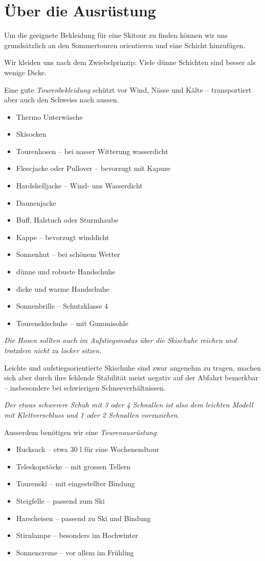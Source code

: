 \section{Über die Ausrüstung}

Um die geeignete Bekleidung für eine Skitour zu finden können wir uns grundsätzlich an den Sommertouren orientieren und eine Schicht hinzufügen.

Wir kleiden uns nach dem Zwiebelprinzip: Viele dünne Schichten sind besser als wenige Dicke.

Eine gute \textit{Tourenbekleidung} schützt vor Wind, Nässe und Kälte -- transportiert aber auch den Schweiss nach aussen.

\begin{itemize}
  \item{Thermo Unterwäsche}
  \item{Skisocken}
  \item{Tourenhosen -- bei nasser Witterung wasserdicht}
  \item{Fleecjacke oder Pullover -- bevorzugt mit Kapuze}
  \item{Hardshelljacke -- Wind- uns Wasserdicht}
  \item{Daunenjacke}
  \item{Buff, Halstuch oder Sturmhaube}
  \item{Kappe -- bevorzugt winddicht}
  \item{Sonnenhut -- bei schönem Wetter}
  \item{dünne und robuste Handschuhe}
  \item{dicke und warme Handschuhe}
  \item{Sonnenbrille -- Schutzklasse 4}
  \item{Tourenskischuhe -- mit Gummisohle}
\end{itemize}

\textit{Die Hosen sollten auch im Aufstiegsmodus über die Skischuhe reichen und trotzdem nicht zu locker sitzen.}

Leichte und aufstiegsorientierte Skischuhe sind zwar angenehm zu tragen, machen sich aber durch ihre fehlende Stabilität meist negativ auf der Abfahrt bemerkbar -- insbesondere bei schwierigen Schneeverhältnissen.

\textit{Der etwas schwerere Schuh mit 3 oder 4 Schnallen ist also dem leichten Modell mit Klettverschluss und 1 oder 2 Schnallen vorzuziehen.}

Ausserdem benötigen wir eine \textit{Tourenausrüstung}:

\begin{itemize}
  \item{Rucksack -- etwa 30 l für eine Wochenendtour}
  \item{Teleskopstöcke -- mit grossen Tellern}
  \item{Tourenski -- mit eingestellter Bindung}
  \item{Steigfelle -- passend zum Ski}
  \item{Harscheisen -- passend zu Ski und Bindung}
  \item{Stirnlampe -- besonders im Hochwinter}
  \item{Sonnencreme -- vor allem im Frühling}
\end{itemize}

